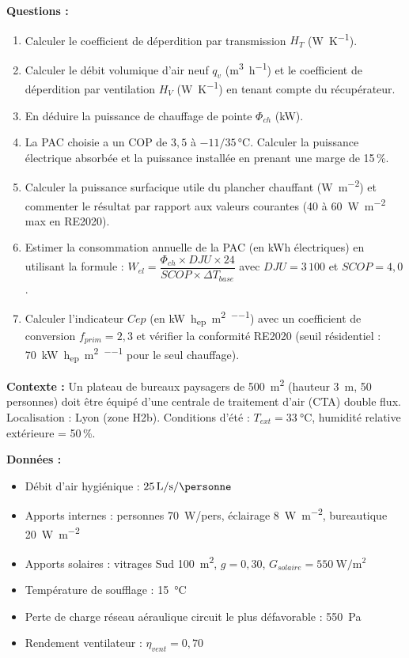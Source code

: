 \bigskip
\textbf{Questions :}

\begin{enumerate}
  \item Calculer le coefficient de déperdition par transmission $H_T$ (\si{\watt\per\kelvin}).
  \item Calculer le débit volumique d'air neuf $q_v$ (\si{\metre\cubed\per\hour}) et le coefficient de déperdition par ventilation $H_V$ (\si{\watt\per\kelvin}) en tenant compte du récupérateur.
  \item En déduire la puissance de chauffage de pointe $\Phi_{ch}$ (\si{\kilo\watt}).
  \item La PAC choisie a un COP de $3{,}5$ à $-11/35\,\si{\celsius}$. Calculer la puissance électrique absorbée et la puissance installée en prenant une marge de 15\,\%.
  \item Calculer la puissance surfacique utile du plancher chauffant (\si{\watt\per\metre\squared}) et commenter le résultat par rapport aux valeurs courantes (40 à \SI{60}{\watt\per\metre\squared} max en RE2020).
  \item Estimer la consommation annuelle de la PAC (en kWh électriques) en utilisant la formule :
        $W_{el} = \dfrac{\Phi_{ch} \times DJU \times 24}{SCOP \times \Delta T_{base}}$
        avec $DJU = 3\,100$ et $SCOP = 4{,}0$.
  \item Calculer l'indicateur $Cep$ (en \si{\kilo\watt\hour_{ep}\per\metre\squared\per\year}) avec un coefficient de conversion $f_{prim} = 2{,}3$ et vérifier la conformité RE2020 (seuil résidentiel : \SI{70}{\kilo\watt\hour_{ep}\per\metre\squared\per\year} pour le seul chauffage).
\end{enumerate}


\textbf{Contexte :}
Un plateau de bureaux paysagers de \SI{500}{\metre\squared} (hauteur \SI{3}{\metre},
50 personnes) doit être équipé d'une centrale de traitement d'air (CTA) double flux.
Localisation : Lyon (zone H2b). Conditions d'été : $T_{ext} = \SI{33}{\celsius}$,
humidité relative extérieure = 50\,\%.

\textbf{Données :}
\begin{itemize}
  \item Débit d'air hygiénique : $25\,\si{\litre\per\second\per\personne}$
  \item Apports internes : personnes \SI{70}{\watt}/pers, éclairage \SI{8}{\watt\per\metre\squared}, bureautique \SI{20}{\watt\per\metre\squared}
  \item Apports solaires : vitrages Sud \SI{100}{\metre\squared}, $g = 0{,}30$, $G_{solaire} = \SI{550}{\watt\per\metre\squared}$
  \item Température de soufflage : \SI{15}{\celsius}
  \item Perte de charge réseau aéraulique circuit le plus défavorable : \SI{550}{\pascal}
  \item Rendement ventilateur : $\eta_{vent} = 0{,}70$
\end{itemize}

